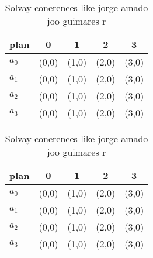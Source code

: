 \documentclass[a4paper]{article}
\begin{document}
\begin{table}
\begin{adjustbox}{width=0.5\columnwidth}
\begin{tabular}{|l|l|l|l|l|}
\hline
\textbf{plan} & \multicolumn{1}{c|}{\textbf{0}} & \multicolumn{1}{c|}{\textbf{1}} & \multicolumn{1}{c|}{\textbf{2}} & \multicolumn{1}{c|}{\textbf{3}} \\ \hline
\textbf{$a_0$}  & (0,0) & (1,0) & (2,0) & (3,0) \\ \hline
\textbf{$a_1$}  & (0,0) & (1,0) & (2,0) & (3,0) \\ \hline
\textbf{$a_2$}  & (0,0) & (1,0) & (2,0) & (3,0) \\ \hline
\textbf{$a_3$}  & (0,0) & (1,0) & (2,0) & (3,0) \\ \hline
\end{tabular}
\end{adjustbox}
\caption{Solvay conerences like jorge amado joo guimares r
}
\end{table}

\begin{table}
\begin{adjustbox}{width=0.5\columnwidth}
\begin{tabular}{|l|l|l|l|l|}
\hline
\textbf{plan} & \multicolumn{1}{c|}{\textbf{0}} & \multicolumn{1}{c|}{\textbf{1}} & \multicolumn{1}{c|}{\textbf{2}} & \multicolumn{1}{c|}{\textbf{3}} \\ \hline
\textbf{$a_0$}  & (0,0) & (1,0) & (2,0) & (3,0) \\ \hline
\textbf{$a_1$}  & (0,0) & (1,0) & (2,0) & (3,0) \\ \hline
\textbf{$a_2$}  & (0,0) & (1,0) & (2,0) & (3,0) \\ \hline
\textbf{$a_3$}  & (0,0) & (1,0) & (2,0) & (3,0) \\ \hline
\end{tabular}
\end{adjustbox}
\caption{Solvay conerences like jorge amado joo guimares r
}
\end{table}
\end{document}
